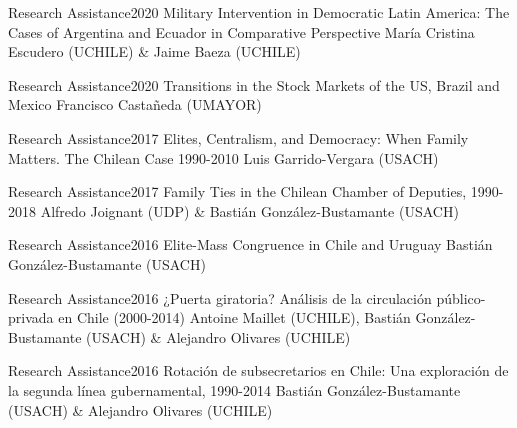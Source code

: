





\begin{projects}
	\project
	{Research Assistance}{2020}
	{Military Intervention in Democratic Latin America: The Cases of Argentina and Ecuador in Comparative Perspective}
	{María Cristina Escudero (UCHILE) \& Jaime Baeza (UCHILE)}

	\project
	{Research Assistance}{2020}
	{Transitions in the Stock Markets of the US, Brazil and Mexico}
	{Francisco Castañeda (UMAYOR)}
	
	\project
	{Research Assistance}{2017}
	{Elites, Centralism, and Democracy: When Family Matters. The Chilean Case 1990-2010}
	{Luis Garrido-Vergara (USACH)}

	\project
	{Research Assistance}{2017}
	{Family Ties in the Chilean Chamber of Deputies, 1990-2018}
	{Alfredo Joignant (UDP) \& Bastián González-Bustamante (USACH)}

	\project
	{Research Assistance}{2016}
	{Elite-Mass Congruence in Chile and Uruguay}
	{Bastián González-Bustamante (USACH)}
	
	\project
	{Research Assistance}{2016}
	{¿Puerta giratoria? Análisis de la circulación público-privada en Chile (2000-2014)}
	{Antoine Maillet (UCHILE), Bastián González-Bustamante (USACH) \& Alejandro Olivares (UCHILE)}

	\project
	{Research Assistance}{2016}
	{Rotación de subsecretarios en Chile: Una exploración de la segunda línea gubernamental, 1990-2014}
	{Bastián González-Bustamante (USACH) \& Alejandro Olivares (UCHILE)}
	
\end{projects}
